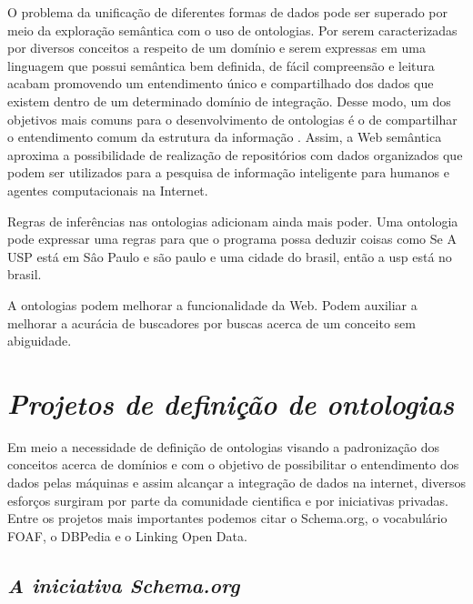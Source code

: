 O problema da unificação de diferentes formas de dados pode ser superado por meio da exploração semântica com o uso de ontologias. Por serem caracterizadas por diversos conceitos a respeito de um domínio e serem expressas em uma linguagem que possui semântica bem definida, de fácil compreensão e leitura \citep{Gali2004, Kabir2014} acabam promovendo um entendimento único e compartilhado dos dados que existem dentro de um determinado domínio de integração. Desse modo, um dos objetivos mais comuns para o desenvolvimento de ontologias é o de compartilhar o entendimento comum da estrutura da informação \citep{Noy2001}. Assim, a Web semântica aproxima a possibilidade de realização de repositórios com dados organizados que podem ser utilizados para a pesquisa de informação inteligente para humanos e agentes computacionais \citep{Gali2004} na Internet.





Regras de inferências nas ontologias adicionam ainda mais poder. Uma ontologia pode expressar uma regras para que o programa possa deduzir coisas como Se A USP está em Sâo Paulo e são paulo e uma cidade do brasil, então a usp está no brasil.

A ontologias podem melhorar a funcionalidade da Web. Podem auxiliar a melhorar a 
acurácia de buscadores por buscas acerca de um conceito sem abiguidade.


\section{\emph{Projetos de definição de ontologias}}
\label{sec:projetos_de_ontologias}

Em meio a necessidade de definição de ontologias visando a padronização dos conceitos acerca de domínios e com o objetivo de possibilitar o entendimento dos dados pelas máquinas e assim alcançar a integração de dados na internet, diversos esforços surgiram por parte da comunidade cientifica e por iniciativas privadas. Entre os projetos mais importantes podemos citar o Schema.org, o vocabulário FOAF, o DBPedia e o Linking Open Data.

\subsection{\emph{A iniciativa Schema.org}}
\label{sec:iniciativa_schema_org}

